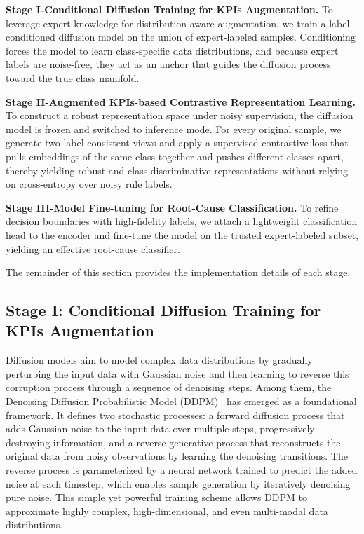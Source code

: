 \documentclass[lettersize,journal]{IEEEtran}
\begin{document}
\noindent
\textbf{Stage I-Conditional Diffusion Training for KPIs Augmentation.}  
To leverage expert knowledge for distribution-aware augmentation, we train a label-conditioned diffusion model on the union of expert-labeled samples. Conditioning forces the model to learn class-specific data distributions, and because expert labels are noise-free, they act as an anchor that guides the diffusion process toward the true class manifold.

\noindent
\textbf{Stage II-Augmented KPIs-based Contrastive Representation Learning.}  
To construct a robust representation space under noisy supervision, the diffusion model is frozen and switched to inference mode. For every original sample, we generate two label-consistent views and apply a supervised contrastive loss that pulls embeddings of the same class together and pushes different classes apart, thereby yielding robust and class-discriminative representations without relying on cross-entropy over noisy rule labels.

\noindent
\textbf{Stage III-Model Fine-tuning for Root-Cause Classification.}  
To refine decision boundaries with high-fidelity labels, we attach a lightweight classification head to the encoder and fine-tune the model on the trusted expert-labeled subset, yielding an effective root-cause classifier.

The remainder of this section provides the implementation details of each stage.

\subsection{Stage I: Conditional Diffusion Training for KPIs Augmentation}
Diffusion models aim to model complex data distributions by gradually perturbing the input data with Gaussian noise and then learning to reverse this corruption process through a sequence of denoising steps. Among them, the Denoising Diffusion Probabilistic Model (DDPM)~\cite{ho2020denoising} has emerged as a foundational framework. 
It defines two stochastic processes: a forward diffusion process that adds Gaussian noise to the input data over multiple steps, progressively destroying information, and a reverse generative process that reconstructs the original data from noisy observations by learning the denoising transitions. The reverse process is parameterized by a neural network trained to predict the added noise at each timestep, which enables sample generation by iteratively denoising pure noise. This simple yet powerful training scheme allows DDPM to approximate highly complex, high-dimensional, and even multi-modal data distributions. 
\end{document}
